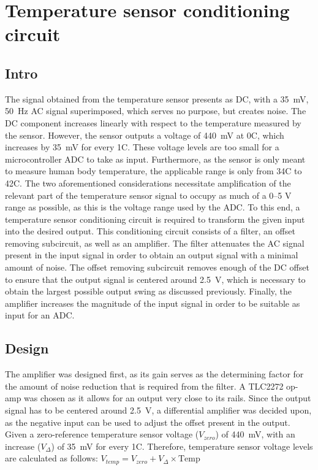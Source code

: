 \chapter{Temperature sensor conditioning circuit}\label{sec:temp_sensor}

\section{Intro} \label{sec:temp_intro}
The signal obtained from the temperature sensor presents as DC, with a \SI{35}{\milli \volt}, \SI{50}{Hz} AC signal superimposed, which serves no purpose, but creates noise. The DC component increases linearly with respect to the temperature measured by the sensor. However, the sensor outputs a voltage of \SI{440}{\milli \volt} at 0\degree C, which increases by \SI{35}{\milli \volt} for every 1\degree C. These voltage levels are too small for a microcontroller ADC to take as input. Furthermore, as the sensor is only meant to measure human body temperature, the applicable range is only from 34\degree C to 42\degree C. The two aforementioned considerations necessitate amplification of the relevant part of the temperature sensor signal to occupy as much of a \numrange{0}{5} \si{\volt} range as possible, as this is the voltage range used by the ADC.
To this end, a temperature sensor conditioning circuit is required to transform the given input into the desired output. This conditioning circuit consists of a filter, an offset removing subcircuit, as well as an amplifier. The filter attenuates the AC signal present in the input signal in order to obtain an output signal with a minimal amount of noise. The offset removing subcircuit removes enough of the DC offset to ensure that the output signal is centered around \SI{2.5}{\volt}, which is necessary to obtain the largest possible output swing as discussed previously. Finally, the amplifier increases the magnitude of the input signal in order to be suitable as input for an ADC.

\section{Design}\label{sec:temp_design}
The amplifier was designed first, as its gain serves as the determining factor for the amount of noise reduction that is required from the filter. A TLC2272 op-amp was chosen as it allows for an output very close to its rails. Since the output signal has to be centered around \SI{2.5}{\volt}, a differential amplifier was decided upon, as the negative input can be used to adjust the offset present in the output. Given a zero-reference temperature sensor voltage ($V_{zero}$) of \SI{440}{\milli \volt}, with an increase ($V_{\Delta}$) of \SI{35}{\milli \volt} for every 1\degree C. Therefore, temperature sensor voltage levels are calculated as follows: $V_{temp} = V_{zero} + V_{\Delta} \times \mathrm{Temp}$ 

